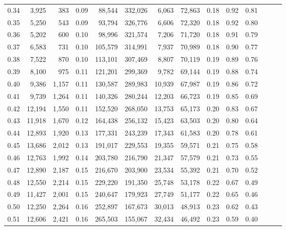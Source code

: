 \begin{tabular}{rrrrrrrrrrrrrr}
0.34 &   3,925 &    383 &  0.09 &   88,544 &  332,026 &   6,063 &  72,863 &  0.18 &  0.92 &      0.81 \\
0.35 &   5,250 &    543 &  0.09 &   93,794 &  326,776 &   6,606 &  72,320 &  0.18 &  0.92 &      0.80 \\
0.36 &   5,202 &    600 &  0.10 &   98,996 &  321,574 &   7,206 &  71,720 &  0.18 &  0.91 &      0.79 \\
0.37 &   6,583 &    731 &  0.10 &  105,579 &  314,991 &   7,937 &  70,989 &  0.18 &  0.90 &      0.77 \\
0.38 &   7,522 &    870 &  0.10 &  113,101 &  307,469 &   8,807 &  70,119 &  0.19 &  0.89 &      0.76 \\
0.39 &   8,100 &    975 &  0.11 &  121,201 &  299,369 &   9,782 &  69,144 &  0.19 &  0.88 &      0.74 \\
0.40 &   9,386 &  1,157 &  0.11 &  130,587 &  289,983 &  10,939 &  67,987 &  0.19 &  0.86 &      0.72 \\
0.41 &   9,739 &  1,264 &  0.11 &  140,326 &  280,244 &  12,203 &  66,723 &  0.19 &  0.85 &      0.69 \\
0.42 &  12,194 &  1,550 &  0.11 &  152,520 &  268,050 &  13,753 &  65,173 &  0.20 &  0.83 &      0.67 \\
0.43 &  11,918 &  1,670 &  0.12 &  164,438 &  256,132 &  15,423 &  63,503 &  0.20 &  0.80 &      0.64 \\
0.44 &  12,893 &  1,920 &  0.13 &  177,331 &  243,239 &  17,343 &  61,583 &  0.20 &  0.78 &      0.61 \\
0.45 &  13,686 &  2,012 &  0.13 &  191,017 &  229,553 &  19,355 &  59,571 &  0.21 &  0.75 &      0.58 \\
0.46 &  12,763 &  1,992 &  0.14 &  203,780 &  216,790 &  21,347 &  57,579 &  0.21 &  0.73 &      0.55 \\
0.47 &  12,890 &  2,187 &  0.15 &  216,670 &  203,900 &  23,534 &  55,392 &  0.21 &  0.70 &      0.52 \\
0.48 &  12,550 &  2,214 &  0.15 &  229,220 &  191,350 &  25,748 &  53,178 &  0.22 &  0.67 &      0.49 \\
0.49 &  11,427 &  2,001 &  0.15 &  240,647 &  179,923 &  27,749 &  51,177 &  0.22 &  0.65 &      0.46 \\
0.50 &  12,250 &  2,264 &  0.16 &  252,897 &  167,673 &  30,013 &  48,913 &  0.23 &  0.62 &      0.43 \\
0.51 &  12,606 &  2,421 &  0.16 &  265,503 &  155,067 &  32,434 &  46,492 &  0.23 &  0.59 &      0.40 \\

\end{tabular}
